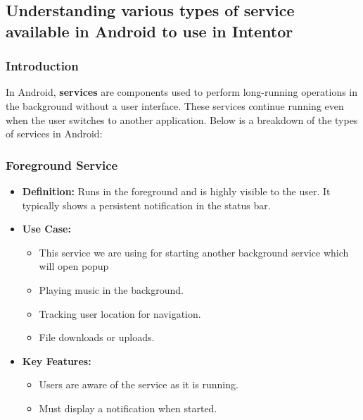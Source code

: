 \documentclass[12pt]{article}
\begin{document}
\begin{itemize}
\begin{enumerate}
      \end{enumerate}
       \subsection{Understanding various types of service available in Android to use in Intentor}
    \subsubsection{Introduction}
    In Android, \textbf{services} are components used to perform long-running operations in the background without a user interface. These services continue running even when the user switches to another application. Below is a breakdown of the types of services in Android:
    
    \subsubsection{ Foreground Service}
    \begin{itemize}[leftmargin=*]
        \item \textbf{Definition:} Runs in the foreground and is highly visible to the user. It typically shows a persistent notification in the status bar.
        \item \textbf{Use Case:}
        \begin{itemize}
            \item This service we are using for starting another background service which will open popup
            \item Playing music in the background.
            \item Tracking user location for navigation.
            \item File downloads or uploads.
        \end{itemize}
        \item \textbf{Key Features:}
        \begin{itemize}
            \item Users are aware of the service as it is running.
            \item Must display a notification when started.
        \end{itemize}
    \end{itemize}
    

\end{itemize}
\end{document}

